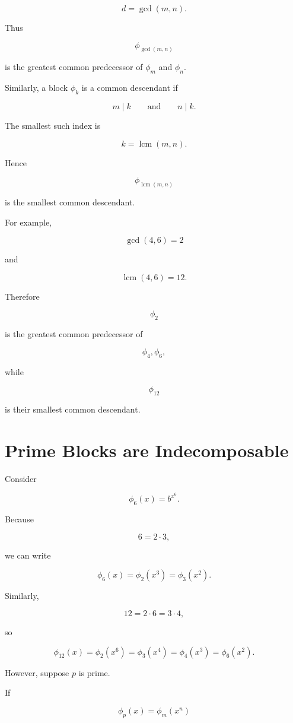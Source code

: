 \[
d=\gcd(m,n).
\]

Thus

\[
\boxed{
\phi_{\gcd(m,n)}
}
\]

is the greatest common predecessor of \(\phi_m\) and \(\phi_n\).

Similarly, a block \(\phi_k\) is a common descendant if

\[
m\mid k
\qquad\text{and}\qquad
n\mid k.
\]

The smallest such index is

\[
k=\operatorname{lcm}(m,n).
\]

Hence

\[
\boxed{
\phi_{\operatorname{lcm}(m,n)}
}
\]

is the smallest common descendant.

For example,

\[
\gcd(4,6)=2
\]

and

\[
\operatorname{lcm}(4,6)=12.
\]

Therefore

\[
\phi_2
\]

is the greatest common predecessor of

\[
\phi_4,\phi_6,
\]

while

\[
\phi_{12}
\]

is their smallest common descendant.

\section{Prime Blocks are Indecomposable}

Consider

\[
\phi_6(x)=b^{x^6}.
\]

Because

\[
6=2\cdot3,
\]

we can write

\[
\phi_6(x)
=
\phi_2(x^3)
=
\phi_3(x^2).
\]

Similarly,

\[
12=2\cdot6=3\cdot4,
\]

so

\[
\phi_{12}(x)
=
\phi_2(x^6)
=
\phi_3(x^4)
=
\phi_4(x^3)
=
\phi_6(x^2).
\]

However, suppose \(p\) is prime.

If

\[
\phi_p(x)=\phi_m(x^n)
\]

